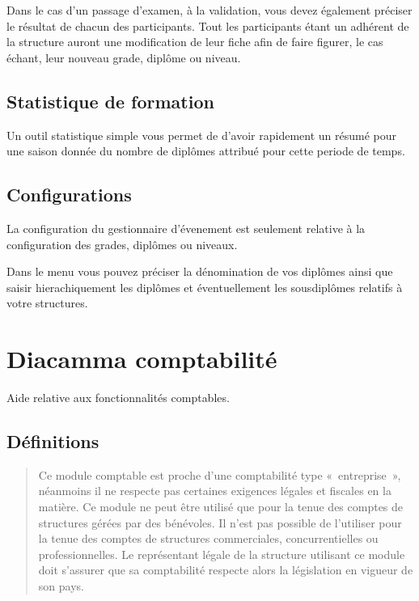 \documentclass[a4paper,10pt,oneside,french]{sphinxmanual}
\begin{document}
\sphinxAtStartPar
Dans le cas d’un passage d’examen, à la validation, vous devez également préciser le résultat de chacun des participants.
Tout les participants étant un adhérent de la structure auront une modification de leur fiche afin de faire figurer, le cas échant, leur nouveau grade, diplôme ou niveau.


\section{Statistique de formation}
\label{\detokenize{event/statistic:statistique-de-formation}}\label{\detokenize{event/statistic::doc}}
\sphinxAtStartPar
Un outil statistique simple vous permet de d’avoir rapidement un résumé pour une saison donnée du nombre de diplômes attribué pour cette periode de temps.


\section{Configurations}
\label{\detokenize{event/config:configurations}}\label{\detokenize{event/config::doc}}
\sphinxAtStartPar
La configuration du gestionnaire d’évenement est seulement relative à la configuration des grades, diplômes ou niveaux.

\sphinxAtStartPar
Dans le menu  vous pouvez préciser la dénomination de vos diplômes
ainsi que saisir hierachiquement les diplômes et éventuellement les sous\sphinxhyphen{}diplômes relatifs à votre structures.


\chapter{Diacamma comptabilité}
\label{\detokenize{accounting/index:diacamma-comptabilite}}\label{\detokenize{accounting/index::doc}}
\sphinxAtStartPar
Aide relative aux fonctionnalités comptables.


\section{Définitions}
\label{\detokenize{accounting/definition:definitions}}\label{\detokenize{accounting/definition::doc}}\begin{quote}

\sphinxAtStartPar
{} Ce module comptable est proche d’une comptabilité type « entreprise », néanmoins il ne respecte pas certaines exigences légales et fiscales en la matière.
Ce module ne peut être utilisé que pour la tenue des comptes de structures gérées par des bénévoles. Il n’est pas possible de l’utiliser pour la tenue des comptes de structures commerciales, concurrentielles ou professionnelles.
Le représentant légale de la structure utilisant ce module doit s’assurer que sa comptabilité respecte alors la législation en vigueur de son pays.
\end{quote}
\end{document}
